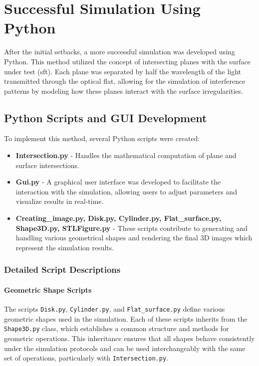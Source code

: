 \documentclass[../main.tex]{subfiles}
\begin{document}
\section{Successful Simulation Using Python}
After the initial setbacks, a more successful simulation was developed using Python. This method utilized the concept of intersecting planes with the surface under test (sft). Each plane was separated by half the wavelength of the light transmitted through the optical flat, allowing for the simulation of interference patterns by modeling how these planes interact with the surface irregularities.

\subsection{Python Scripts and GUI Development}
To implement this method, several Python scripts were created:
\begin{itemize}
    \item \textbf{Intersection.py} - Handles the mathematical computation of plane and surface intersections.
    \item \textbf{Gui.py} - A graphical user interface was developed to facilitate the interaction with the simulation, allowing users to adjust parameters and visualize results in real-time.
    \item \textbf{Creating\_image.py, Disk.py, Cylinder.py, Flat\_surface.py, Shape3D.py, STLFigure.py} - These scripts contribute to generating and handling various geometrical shapes and rendering the final 3D images which represent the simulation results.
\end{itemize}

\subsubsection{Detailed Script Descriptions}

\paragraph{Geometric Shape Scripts}
The scripts \texttt{Disk.py}, \texttt{Cylinder.py}, and \texttt{Flat\_surface.py} define various geometric shapes used in the simulation. Each of these scripts inherits from the \texttt{Shape3D.py} class, which establishes a common structure and methods for geometric operations. This inheritance ensures that all shapes behave consistently under the simulation protocols and can be used interchangeably with the same set of operations, particularly with \texttt{Intersection.py}.
\end{document}
